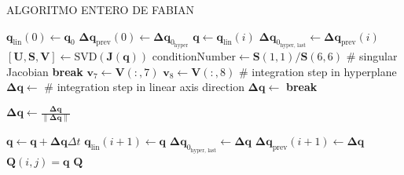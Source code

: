 \begin{algorithm}[H]
	\caption{ALGORITMO ENTERO DE FABIAN}
	\label{alg:pasdasdming}
	\begin{algorithmic}[1]
		\State $\mathbf{q}_{\mathrm{lin}}(0) \gets \mathbf{q}_0$
		\State $\mathbf{\Delta}\mathbf{q}_{\mathrm{prev}}(0) \gets \mathbf{\Delta}\mathbf{q}_{0_{\text{hyper}}}$
		\State $\mathbf{q} \gets \mathbf{q}_{\mathrm{lin}}(i)$
		\State $\mathbf{\Delta}\mathbf{q}_{0_{\text{hyper, last}}} \gets \mathbf{\Delta}\mathbf{q}_{\text{prev}}(i)$
		\State $[\mathbf{U},\mathbf{S},\mathbf{V}] \gets \text{SVD}(\mathbf{J}(\mathbf{q}))$
		\State $\text{conditionNumber} \gets \mathbf{S}(1,1)/\mathbf{S}(6,6)$
		 \; \# singular Jacobian
		\State \textbf{break}			
		\EndIf
		\State $ \mathbf{v}_7 \gets \mathbf{V}(:,7)$
		\State $ \mathbf{v}_8 \gets \mathbf{V}(:,8)$
		 \; \# integration step in hyperplane 
		\State $\mathbf{\Delta}\mathbf{q} \gets$ 
		\Else  \; \# integration step in linear axis direction
		\State $\mathbf{\Delta}\mathbf{q} \gets$ 
		\State \textbf{break}
		\EndIf
		
		\EndIf
		\State $\mathbf{\Delta}\mathbf{q}\gets \frac{\mathbf{\Delta}\mathbf{q}}{\|\mathbf{\Delta}\mathbf{q}\|}$
		
		\State $\mathbf{q} \gets \mathbf{q} +\mathbf{\Delta}\mathbf{q} \Delta t$
		\State $\mathbf{q}_{\mathrm{lin}}(i+1)\gets\mathbf{q}$	
		\Else 
		\State $\mathbf{\Delta}\mathbf{q}_{0_{\text{hyper, last}}} \gets \mathbf{\Delta}\mathbf{q}$
		\State $\mathbf{\Delta}\mathbf{q}_{\text{prev}}(i+1) \gets \mathbf{\Delta}\mathbf{q}$
		\EndIf
		\EndIf
		\State $\mathbf{Q}(i,j) = \mathbf{q}$
		\EndFor
		\EndFor
		\State \Return $\mathbf{Q}$
		\EndProcedure
		
	\end{algorithmic}
	\label{alg:samplingAlgorithm}
\end{algorithm}

